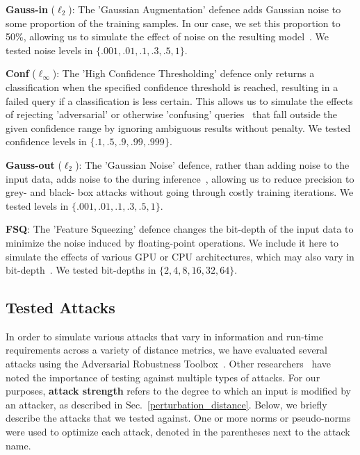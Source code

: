 \textbf{Gauss-in} ($\ell_2$): The 'Gaussian Augmentation' defence adds Gaussian noise to some proportion of the training samples. In our case, we set this proportion to 50\%, allowing us to simulate the effect of noise on the resulting model~\citep{gauss_aug}. We tested noise levels in $\{.001, .01, .1, .3, .5, 1\}$.

\textbf{Conf} ($\ell_{\infty}$): The 'High Confidence Thresholding' defence only returns a classification when the specified confidence threshold is reached, resulting in a failed query if a classification is less certain. This allows us to simulate the effects of rejecting 'adversarial' or otherwise 'confusing' queries~\citep{high_conf} that fall outside the given confidence range by ignoring ambiguous results without penalty. We tested confidence levels in $\{.1, .5, .9, .99, .999\}$.

\textbf{Gauss-out} ($\ell_2$): The 'Gaussian Noise' defence, rather than adding noise to the input data, adds noise to the during inference~\citep{gauss_out}, allowing us to reduce precision to grey- and black- box attacks without going through costly training iterations. We tested levels in $\{.001, .01, .1, .3, .5, 1\}$. 

\textbf{FSQ}: The 'Feature Squeezing' defence changes the bit-depth of the input data to minimize the noise induced by floating-point operations. We include it here to simulate the effects of various GPU or CPU architectures, which may also vary in bit-depth~\citep{feature_squeezing}. We tested bit-depths in $\{2, 4, 8, 16, 32, 64\}$.



\subsection{Tested Attacks}
\label{attacks}

In order to simulate various attacks that vary in information and run-time requirements across a variety of distance metrics, we have evaluated several attacks using the Adversarial Robustness Toolbox~\citep{art2018}. Other researchers~\citep{carlini_towards_2017} have noted the importance of testing against multiple types of attacks. For our purposes, \textbf{attack strength} refers to the degree to which an input is modified by an attacker, as described in Sec.~\ref{perturbation_distance}. Below, we briefly describe the attacks that we tested against. One or more norms or pseudo-norms were used to optimize each attack, denoted in the parentheses next to the attack name. 

